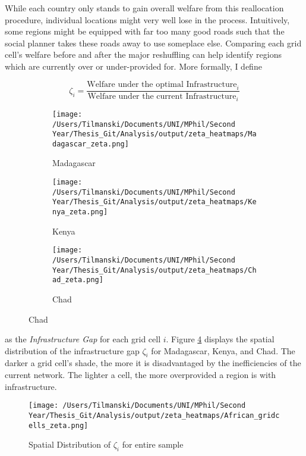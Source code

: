\documentclass[11pt, oneside]{article}   	%
\begin{document}
While each country only stands to gain overall welfare from this reallocation procedure, individual locations might very well lose in the process. Intuitively, some regions might be equipped with far too many good roads such that the social planner takes these roads away to use someplace else. Comparing each grid cell's welfare before and after the major reshuffling can help identify regions which are currently over or under-provided for. More formally, I define

\begin{equation}
  \zeta_{i} = \frac{\textrm{Welfare under the optimal Infrastructure}_{i}}{\textrm{Welfare under the current Infrastructure}_{i}}
\end{equation}

\begin{figure}
\centering
\caption{Spatial Distribution of $\zeta_{i}$ for sample countries}

\begin{subfigure}[c]{0.32\textwidth}
\texttt{[image: /Users/Tilmanski/Documents/UNI/MPhil/Second Year/Thesis\_Git/Analysis/output/zeta\_heatmaps/Madagascar\_zeta.png]}
\caption{Madagascar}
\label{fig:Madagascar_zeta}
\end{subfigure}
\begin{subfigure}[c]{0.32\textwidth}
\texttt{[image: /Users/Tilmanski/Documents/UNI/MPhil/Second Year/Thesis\_Git/Analysis/output/zeta\_heatmaps/Kenya\_zeta.png]}
\caption{Kenya}
\label{fig:Kenya_zeta}
\end{subfigure}
\begin{subfigure}[c]{0.32\textwidth}
\texttt{[image: /Users/Tilmanski/Documents/UNI/MPhil/Second Year/Thesis\_Git/Analysis/output/zeta\_heatmaps/Chad\_zeta.png]}
\caption{Chad}
\label{fig:Chad_zeta}
\end{subfigure}
\label{fig:zeta_countries}
\end{figure}

as the \emph{Infrastructure Gap} for each grid cell $i$. Figure \ref{fig:zeta_countries} displays the spatial distribution of the infrastructure gap $\zeta_{i}$ for Madagascar, Kenya, and Chad. The darker a grid cell's shade, the more it is disadvantaged by the inefficiencies of the current network. The lighter a cell, the more overprovided a region is with infrastructure.

\begin{figure}
\centering
\caption{Spatial Distribution of $\zeta_{i}$ for entire sample}
\texttt{[image: /Users/Tilmanski/Documents/UNI/MPhil/Second Year/Thesis\_Git/Analysis/output/zeta\_heatmaps/African\_gridcells\_zeta.png]}

\label{fig:all_gridcells_by_zeta}
\end{figure}
\end{document}
